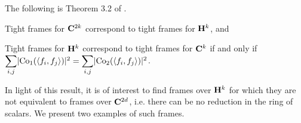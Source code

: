 \documentclass[../../../main]{subfiles}
\begin{document}
The following is Theorem 3.2 of \cite{waldron-quaternions}.

\begin{thm}\label{quaternion-complex-frame-thm}
 \begin{defenum}
  \item Tight frames for $\mathbf{C}^{2k}$ correspond to tight frames for $\mathbf{H}^k$, and
  \item Tight frames for $\mathbf{H}^k$ correspond to tight frames for $\mathbf{C}^k$ if and only if $\ssum_{i,j}\abs{\co(\sharps{f_i,f_j})}^2 = \ssum_{i,j}\abs{\coo(\sharps{f_i,f_j})}^2$.
 \end{defenum}
\end{thm}

In light of this result, it is of interest to find frames over $\mathbf{H}^k$ for which they are not equivalent to frames over $\mathbf{C}^{2d}$, i.e. there can be no reduction in the ring of scalars. We present two examples of such frames.
\end{document}
